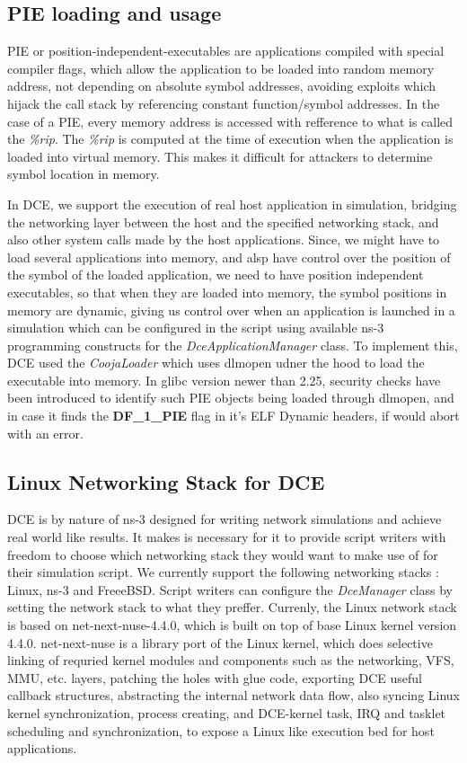 \documentclass{sig-alternate}
\begin{document}
\subsection{PIE loading and usage}
PIE or position-independent-executables are applications compiled with special compiler flags, which allow the application to be loaded into random 
memory address, not depending on absolute symbol addresses, avoiding exploits which hijack the call stack by referencing constant function/symbol addresses.
In the case of a PIE, every memory address is accessed with refference to what is called the \textit{\%rip}. The \textit{\%rip} is computed at the time 
of execution when the application is loaded into virtual memory. This makes it difficult for attackers to determine symbol location in memory.

In DCE, we support the execution of real host application in simulation, bridging the networking layer between the host and the specified networking stack,
and also other system calls made by the host applications. Since, we might have to load several applications into memory, and alsp have control over the
position of the  symbol of the loaded application, we need to have position independent executables, so that when they are loaded into memory,
the symbol positions in memory are dynamic, giving us control over when an application is launched in a simulation which can be configured in the script 
using available ns-3 programming constructs for the \textit{DceApplicationManager} class. To implement this, DCE used the \textit{CoojaLoader} which 
uses dlmopen udner the hood to load the executable into memory. In glibc version newer than 2.25, security checks have been introduced to identify such 
PIE objects being loaded through dlmopen, and in case it finds the \textbf{DF\_1\_PIE} flag in it's ELF Dynamic headers, if would abort with an error.


\subsection{Linux Networking Stack for DCE}
DCE is by nature of ns-3 designed for writing network simulations and achieve real world like results. It makes is necessary for it to provide script 
writers with freedom to choose which networking stack they would want to make use of for their simulation script. We currently support the following 
networking stacks : Linux, ns-3 and FreeeBSD. Script writers can configure the \textit{DceManager} class by setting the network stack to what they preffer.
Currenly, the Linux network stack is based on net-next-nuse-4.4.0, which is built on top of base Linux kernel version 4.4.0. net-next-nuse is a library 
port of the Linux kernel, which does selective linking of requried kernel modules and components such as the networking, VFS, MMU, etc. layers, patching 
the holes with glue code, exporting DCE useful callback structures, abstracting the internal network data flow, also syncing Linux kernel synchronization, 
process creating, and DCE-kernel task, IRQ and tasklet scheduling and synchronization, to expose a Linux like execution bed for host applications. 
\end{document}
